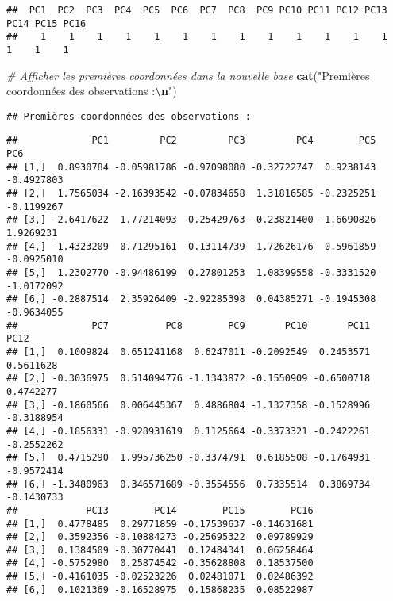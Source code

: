 \documentclass[
]{article}
\newenvironment{Shaded}{\begin{snugshade}}{\end{snugshade}}
\newcommand{\CommentTok}[1]{\textcolor[rgb]{0.56,0.35,0.01}{\textit{#1}}}
\newcommand{\FunctionTok}[1]{\textcolor[rgb]{0.13,0.29,0.53}{\textbf{#1}}}
\newcommand{\NormalTok}[1]{#1}
\newcommand{\SpecialCharTok}[1]{\textcolor[rgb]{0.81,0.36,0.00}{\textbf{#1}}}
\newcommand{\StringTok}[1]{\textcolor[rgb]{0.31,0.60,0.02}{#1}}
\begin{document}
\begin{verbatim}
##  PC1  PC2  PC3  PC4  PC5  PC6  PC7  PC8  PC9 PC10 PC11 PC12 PC13 PC14 PC15 PC16 
##    1    1    1    1    1    1    1    1    1    1    1    1    1    1    1    1
\end{verbatim}

\begin{Shaded}
\begin{Highlighting}[]
\CommentTok{\# Afficher les premières coordonnées dans la nouvelle base}
\FunctionTok{cat}\NormalTok{(}\StringTok{"Premières coordonnées des observations :}\SpecialCharTok{\textbackslash{}n}\StringTok{"}\NormalTok{)}
\end{Highlighting}
\end{Shaded}

\begin{verbatim}
## Premières coordonnées des observations :
\end{verbatim}

\begin{Shaded}
\end{Shaded}

\begin{verbatim}
##             PC1         PC2         PC3         PC4        PC5        PC6
## [1,]  0.8930784 -0.05981786 -0.97098080 -0.32722747  0.9238143 -0.4927803
## [2,]  1.7565034 -2.16393542 -0.07834658  1.31816585 -0.2325251 -0.1199267
## [3,] -2.6417622  1.77214093 -0.25429763 -0.23821400 -1.6690826  1.9269231
## [4,] -1.4323209  0.71295161 -0.13114739  1.72626176  0.5961859 -0.0925010
## [5,]  1.2302770 -0.94486199  0.27801253  1.08399558 -0.3331520 -1.0172092
## [6,] -0.2887514  2.35926409 -2.92285398  0.04385271 -0.1945308 -0.9634055
##             PC7          PC8        PC9       PC10       PC11       PC12
## [1,]  0.1009824  0.651241168  0.6247011 -0.2092549  0.2453571  0.5611628
## [2,] -0.3036975  0.514094776 -1.1343872 -0.1550909 -0.6500718  0.4742277
## [3,] -0.1860566  0.006445367  0.4886804 -1.1327358 -0.1528996 -0.3188954
## [4,] -0.1856331 -0.928931619  0.1125664 -0.3373321 -0.2422261 -0.2552262
## [5,]  0.4715290  1.995736250 -0.3374791  0.6185508 -0.1764931 -0.9572414
## [6,] -1.3480963  0.346571689 -0.3554556  0.7335514  0.3869734 -0.1430733
##            PC13        PC14        PC15        PC16
## [1,]  0.4778485  0.29771859 -0.17539637 -0.14631681
## [2,]  0.3592356 -0.10884273 -0.25695322  0.09789929
## [3,]  0.1384509 -0.30770441  0.12484341  0.06258464
## [4,] -0.5752980  0.25874542 -0.35628808  0.18537500
## [5,] -0.4161035 -0.02523226  0.02481071  0.02486392
## [6,]  0.1021369 -0.16528975  0.15868235  0.08522987
\end{verbatim}
\end{document}
